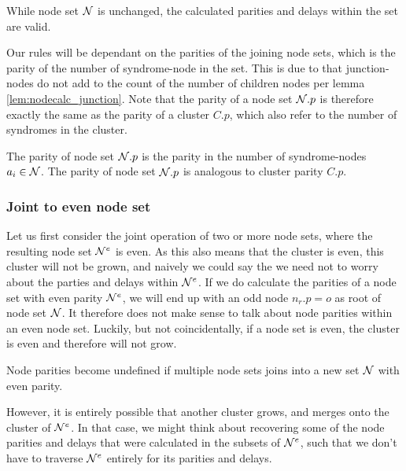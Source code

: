 \begin{lemma}\label{lem:nodesetunchanged}
  While node set $\mathcal{N}$ is unchanged, the calculated parities and delays within the set are valid.
\end{lemma}

Our rules will be dependant on the parities of the joining node sets, which is the parity of the number of syndrome-node in the set. This is due to that junction-nodes do not add to the count of the number of children nodes per lemma \ref{lem:nodecalc_junction}. Note that the parity of a node set $\mathcal{N}.p$ is therefore exactly the same as the parity of a cluster $C.p$, which also refer to the number of syndromes in the cluster.

\begin{lemma}
  The parity of node set $\mathcal{N}.p$ is the parity in the number of syndrome-nodes $a_i \in \mathcal{N}$. The parity of node set $\mathcal{N}.p$ is analogous to cluster parity $C.p$.
\end{lemma}

\subsubsection{Joint to even node set}

Let us first consider the joint operation of two or more node sets, where the resulting node set $\mathcal{N}^{e}$ is even. As this also means that the cluster is even, this cluster will not be grown, and naively we could say the we need not to worry about the parties and delays within $\mathcal{N}^{e}$. If we do calculate the parities of a node set with even parity $\mathcal{N}^e$, we will end up with an odd node $n_r.p=o$ as root of node set $\mathcal{N}$. It therefore does not make sense to talk about node parities within an even node set. Luckily, but not coincidentally, if a node set is even, the cluster is even and therefore will not grow.

\begin{lemma}\label{lem:nodecalc_even}
  Node parities become undefined if multiple node sets joins into a new set $\mathcal{N}$ with even parity.
\end{lemma}

However, it is entirely possible that another cluster grows, and merges onto the cluster of $\mathcal{N}^{e}$. In that case, we might think about recovering some of the node parities and delays that were calculated in the subsets of $\mathcal{N}^e$, such that we don't have to traverse $\mathcal{N}^{e}$ entirely for its parities and delays.

